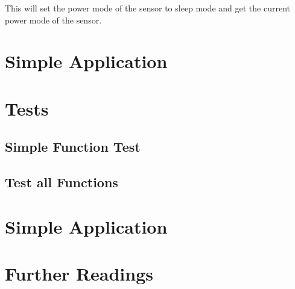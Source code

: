 \medskip




This will set the power mode of the sensor to sleep mode and get the current power mode of the sensor.

\section{Simple Application}



\section{Tests}

\subsection{Simple Function Test}

\subsection{Test all Functions}

\section{Simple Application}


\section{Further Readings}

